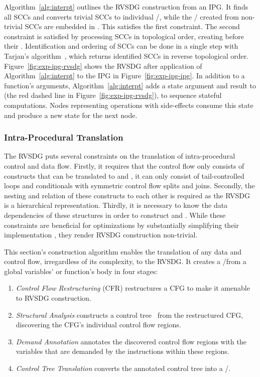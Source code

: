 Algorithm~\ref{alg:interpt} outlines the RVSDG construction from an IPG. It finds all SCCs
and converts trivial SCCs to individual \deltam/\lambdanodes, while the \deltam/\lambdanodes
created from non-trivial SCCs are embedded in \phinodes. This satisfies the first constraint. The
second
constraint is satisfied by processing SCCs in topological order, creating \lambdanodes before their
\applynodes. Identification and ordering of SCCs can be done in a single step with
Tarjan's algorithm~\cite{Tarjan72}, which returns identified SCCs in reverse topological order.
Figure~\ref{fig:exp-ipg-rvsdg} shows the RVSDG after application of Algorithm~\ref{alg:interpt}
to the IPG in Figure~\ref{fig:exp-ipg-ipg}. In addition to a function's arguments,
Algorithm~\ref{alg:interpt} adds a state argument and result to \lambdaregions (the
red dashed line in Figure~\ref{fig:exp-ipg-rvsdg}), to sequence stateful computations.
Nodes representing operations with
side-effects consume this state and produce a new state for the next node.

\subsubsection{Intra-Procedural Translation}\label{sec:intraproc}
The RVSDG puts several constraints on the translation of intra-procedural control and data flow.
Firstly, it requires that the control flow only consists of constructs that can be translated to
\gammam and \thetanodes, \ie it can only consist of tail-controlled loops and conditionals with
symmetric control flow splits and joins. Secondly, the nesting and relation of these
constructs to each other is required as the RVSDG is a hierarchical representation. Thirdly, it is
necessary to know the data dependencies of these structures in order to construct \gammam and
\thetanodes. While these constraints are beneficial for optimizations by substantially simplifying
their implementation%
, they render RVSDG construction non-trivial.

This section's construction algorithm enables the translation of any data and control flow,
irregardless of its complexity, to the RVSDG. It creates a \deltam/\lambdaregion from a global
variables' or function's body in four stages:

\begin{enumerate}
	\item \textit{Control Flow Restructuring} (CFR) restructures a CFG to make
		it amenable to RVSDG construction.

	\item \textit{Structural Analysis} constructs a control tree~\cite{Muchnick97} from the
		restructured CFG, discovering the CFG's individual control flow regions.

	\item \textit{Demand Annotation} annotates the discovered control flow regions with the
		variables that are demanded by the instructions within these regions.

	\item \textit{Control Tree Translation} converts the annotated control tree into a
		\deltam/\lambdaregion.
\end{enumerate}

